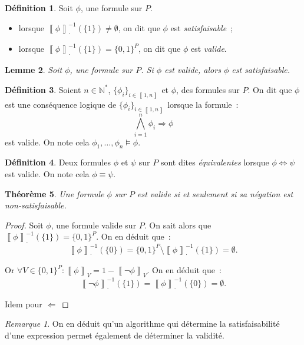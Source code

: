 \documentclass{article}
\newtheorem{thm}{Théorème}[section]
\newtheorem{lem}[thm]{Lemme}
\theoremstyle{definition}
\newtheorem{déf}[thm]{Définition}
\theoremstyle{remark}
\newtheorem*{rmq}{Remarque}
\newcommand{\intint}[2]{\left\llbracket#1, #2\right\rrbracket}
\newcommand{\logeval}[1]{\left\llbracket#1\right\rrbracket}
\newcommand{\N}{\mathbb N}
\begin{document}
	\begin{déf} Soit $\phi$, une formule sur $P$.
	\begin{itemize}
		\item lorsque $\logeval \phi_\cdot^{-1}(\{1\}) \neq \emptyset$, on dit que $\phi$ est \textit{satisfaisable}~;
		\item lorsque $\logeval \phi_\cdot^{-1}(\{1\}) = \{0, 1\}^P$, on dit que $\phi$ est \textit{valide}.
	\end{itemize}
	\end{déf}

	\begin{lem} Soit $\phi$, une formule sur $P$. Si $\phi$ est valide, alors $\phi$ est satisfaisable.
	\end{lem}

	\begin{déf} Soient $n \in \N^*$, $\{\phi_i\}_{i \in \intint 1n}$ et $\phi$, des formules sur $P$. On dit que $\phi$ est une conséquence logique de
	$\{\phi_i\}_{i \in \intint 1n}$ lorsque la formule~:
	\[\bigwedge_{i=1}^n\phi_i \Rightarrow \phi\]
	est valide. On note cela $\phi_1, \ldots, \phi_n \models \phi$.
	\end{déf}

	\begin{déf} Deux formules $\phi$ et $\psi$ sur $P$ sont dites \textit{équivalentes} lorsque $\phi \Leftrightarrow \psi$ est valide. On note cela
	$\phi \equiv \psi$.
	\end{déf}

	\begin{thm} Une formule $\phi$ sur $P$ est valide si et seulement si sa négation est non-satisfaisable.
	\end{thm}

	\begin{proof} Soit $\phi$, une formule valide sur $P$. On sait alors que $\logeval \phi_\cdot^{-1}(\{1\}) = \{0, 1\}^P$. On en déduit que~:
	\[\logeval\phi_\cdot^{-1}(\{0\}) = \{0, 1\}^P \setminus \logeval \phi_\cdot^{-1}(\{1\}) = \emptyset.\]

	Or $\forall V \in \{0, 1\}^P : \logeval \phi_V = 1-\logeval {\lnot\phi}_V$. On en déduit que~:
	\[\logeval {\lnot \phi}_\cdot^{-1}(\{1\}) = \logeval {\phi}_\cdot^{-1}(\{0\}) = \emptyset.\]

	Idem pour $\Leftarrow$
	\end{proof}

	\begin{rmq} On en déduit qu'un algorithme qui détermine la satisfaisabilité d'une expression permet également de déterminer la validité.
	\end{rmq}
\end{document}
